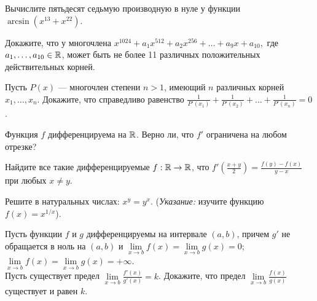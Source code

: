 \documentclass[a4paper, 12pt]{article}
\newcommand{\0}[1]{\overline{#1}}
\begin{document}
Вычислите пятьдесят седьмую производную в нуле у функции
$\arcsin(x^{13}+x^{22})$.


Докажите, что у многочлена
$x^{1024}+ a_1x^{512} +a_2x^{256}+\dots + a_{9}x + a_{10},$
где $a_1,\dots, a_{10}\in\mathbb{R}$, может быть не более 11 различных
положительных действительных корней.


 Пусть $P(x)$ --- многочлен степени $n>1$, имеющий $n$ различных
корней $x_1, \dots ,x_n.$ Докажите, что справедливо равенство
$\frac{1}{P'(x_1)}+\frac{1}{P'(x_2)}+\dots+\frac{1}{P'(x_n)}=0$.





Функция $f$ дифференцируема на $\mathbb{R}$. Верно ли, что
$f'$ ограничена на любом отрезке?


Найдите все такие дифференцируемые $f:\mathbb{R}\rightarrow\mathbb{R}$,
что $f'(\frac{x+y}{2})=\frac{f(y)-f(x)}{y-x}$ при
любых $x\ne y$.





 Решите в натуральных числах: $x^y=y^x$.
({\sl Указание:}
изучите функцию $f(x)=x^{1/x}$).

  Пусть функции $f$ и $g$
дифференцируемы на интервале $(a,b)$,
причем $g'$ не обращается в ноль на $(a,b)$ и
$\lim\limits_{x\rightarrow b}f(x)=\lim\limits_{x\rightarrow b}g(x)=0$;
$\lim\limits_{x\rightarrow b}f(x)=\lim\limits_{x\rightarrow b}g(x)=+\infty$.\\
Пусть существует предел
$\lim\limits_{x\to b}\frac{f'(x)}{g'(x)}=k$. Докажите, что предел
$\lim\limits_{x\to b}\frac{f(x)}{g(x)}$ существует и равен $k$.
\label{lop}
\end{document}
